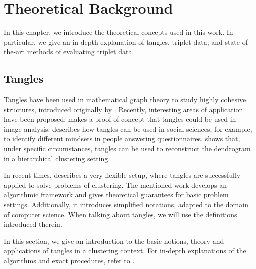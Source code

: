 \chapter{Theoretical Background}\label{theory}
In this chapter, we introduce the theoretical concepts used in this work. 
In particular, we give an in-depth explanation of tangles, triplet data, and state-of-the-art methods of evaluating triplet data.

\section{Tangles}\label{theory:tangles}
Tangles have been used in mathematical graph theory to study highly cohesive structures, 
introduced originally by \cite{robertsonGraphMinorsObstructions1991}. 
Recently, interesting areas of application have been proposed:
\cite{diestelTanglesMonaLisa2017} makes a proof of concept that tangles could 
be used in image analysis.
\cite{diestelTanglesSocialSciences2019} describes how tangles can be used in social sciences, for 
example, to identify different mindsets in people answering questionnaires.
\cite{Fluck2019} shows that, under specific circumstances, tangles can be
used to reconstruct the dendrogram in a hierarchical clustering setting. 

In recent times, \cite{klepperClusteringTanglesAlgorithmic2021} describes a very flexible setup,
where tangles are successfully applied to solve problems of clustering. 
The mentioned work develops an algorithmic framework and gives theoretical guarantees for 
basic problem settings.
Additionally, it introduces simplified notations, adapted to the domain of computer science. 
When talking about tangles, we will use the definitions introduced therein. 

In this section, we give an introduction to the basic notions, theory and applications of tangles in a clustering context.
For in-depth explanations of the algorithms and exact procedures, refer to 
\cite{klepperClusteringTanglesAlgorithmic2021}.


